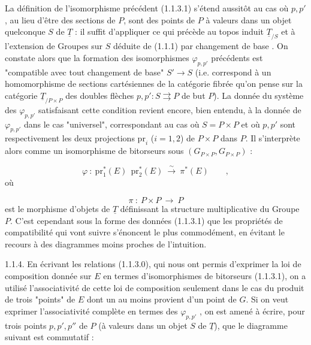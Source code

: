 La définition de l'isomorphisme précédent (1.1.3.1) s'étend aussitôt au cas où $p,p'$, au lieu d'être des sections de $P$, sont des points de $P$ à valeurs dans un objet quelconque $S$ de $\underline{T}$ : il suffit d'appliquer ce qui précède au topos induit $\underline{T}_{/S}$ et à l'extension de Groupes sur $S$ déduite de (1.1.1) par changement de base . On constate alors que la formation des isomorphismes $\varphi_{p,p'}$ précédents est "compatible avec tout changement de base" $S' \longrightarrow S$ (i.e. correspond à un homomorphisme de sections cartésiennes de la catégorie fibrée qu'on pense sur la catégorie $\underline{T}_{/P\times P}$ des doubles flèches $p,p' : S \rightrightarrows P$ de but $P$). La donnée du système des $\varphi_{p,p'}$ satisfaisant cette condition revient encore, bien entendu, à la donnée de $\varphi_{p,p'}$ dans le cas "universel", correspondant au cas où $S = P\times P$ et où $p,p'$ sont respectivement les deux projections $\mathrm{pr}_i$ ($i=1,2$) de $P\times P$ dans $P$. Il s'interprète alors comme un isomorphisme de bitorseurs sous $(G_{P\times P},G_{P\times P})$ :

\begin{equation}\tag{1.1.3.2}
\varphi \ :\ \mathrm{pr}_1^*(E)\ \ \mathrm{pr}_2^*(E)\ \overset{\sim}{\longrightarrow}\ \pi^*(E) \qquad ,
\end{equation}
où

\begin{equation*}
\pi \ :\ P\times P \ \longrightarrow\ P
\end{equation*}
est le morphisme d'objets de $\underline{T}$ définissant la structure multiplicative du Groupe $P$. C'est cependant sous la forme des données (1.1.3.1) que les propriétés de compatibilité qui vont suivre s'énoncent le plus commodément, en évitant le recours à des diagrammes moins proches de l'intuition.



1.1.4.  En écrivant les relations (1.1.3.0), qui nous ont permis d'exprimer la loi de composition donnée sur $E$ en termes d'isomorphismes de bitorseurs (1.1.3.1), on a utilisé l'associativité de cette loi de composition seulement dans le cas du produit de trois "points" de $E$ dont un au moins provient d'un point de $G$. Si on veut exprimer l'associativité complète en termes des $\varphi_{p,p'}$ , on est amené à écrire, pour trois points $p,p',p''$ de $P$ (à valeurs dans un objet $S$ de $\underline{T}$), que le diagramme suivant est commutatif :

